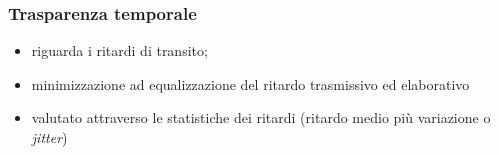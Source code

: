 \documentclass{book}
\begin{document}
\subsubsection{Trasparenza temporale}
\label{sec:trtemp}
\begin{itemize}
\item riguarda i ritardi di transito;
\item minimizzazione ad equalizzazione del ritardo trasmissivo ed elaborativo
\item valutato attraverso le statistiche dei ritardi (ritardo medio più variazione o \textit{jitter})
\end{itemize}
\end{document}
